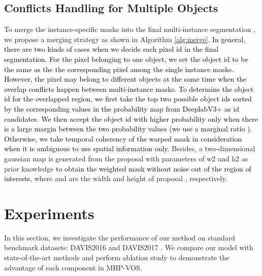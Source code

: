 \documentclass[10pt,twocolumn,letterpaper]{article}
\newcommand{\ldz}[1]{\textcolor{black}{#1}}
\begin{document}
\subsection{Conflicts Handling for Multiple Objects}
\label{multiple_objects}
\vspace{-5pt}

To merge the instance-specific masks  into the final multi-instance segmentation , we propose a merging strategy as shown in Algorithm \ref{alg:merge}. 
\ldz{In general, there are two kinds of cases when we decide each pixel id in the final segmentation. For the pixel belonging to one object, we set the object id to be the same as the the corresponding pixel among the single instance masks. However, the pixel may belong to different objects at the same time when the overlap conflicts happen between multi-instance masks. To determine the object id for the overlapped region, we first take the top two possible object ids sorted by the corresponding values in the probability map from DeeplabV3+ as id candidates. 
We then accept the object id with higher probability only when there is a large margin between the two probability values (we use a marginal ratio ). Otherwise, we take temporal coherency of the warped mask in consideration when it is ambiguous to use spatial information only.}
Besides, a two-dimensional gaussian map  is generated from the proposal  with parameters of w2 and h2 as prior knowledge \ldz{to obtain the weighted mask without noise out of the region of interests}, where  and  are the width and height of proposal , respectively. 







\vspace{-10pt}
\section{Experiments}
\vspace{-7pt}
In this section, we investigate the performance of our method on standard benchmark datasets: DAVIS2016 \cite{perazzi2016benchmark} and DAVIS2017 \cite{caelles20182018}. We compare our model with state-of-the-art methods and perform ablation study to demonstrate the advantage of each component in MHP-VOS. 
\end{document}
